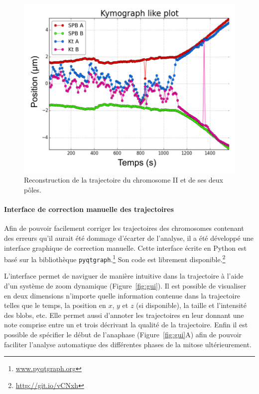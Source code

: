 \documentclass[12pt,a4paper,twoside,openright]{book}
\let\oldparagraph\paragraph
\renewcommand{\paragraph}[1]{\oldparagraph{#1}\mbox{}}
\begin{document}
\begin{figure}[htbp]
\centering
\includegraphics{figures/results/imaging/cen2.png}
\caption[Reconstruction de la trajectoire du chromosome II et de ces deux pôles.]{\label{fig:cen2}Reconstruction
de la trajectoire du chromosome II et de ses deux pôles.}
\end{figure}

\paragraph{Interface de correction manuelle des
trajectoires}\label{interface-de-correction-manuelle-des-trajectoires}

Afin de pouvoir facilement corriger les trajectoires des chromosomes
contenant des erreurs qu'il aurait été dommage d'écarter de l'analyse,
il a été développé une interface graphique de correction manuelle. Cette
interface écrite en Python est basé sur la bibliothèque
\texttt{pyqtgraph}.\footnote{\url{www.pyqtgraph.org}} Son code est
librement disponible.\footnote{\url{http://git.io/vCNxh}}

L'interface permet de naviguer de manière intuitive dans la trajectoire
à l'aide d'un système de zoom dynamique (Figure~\ref{fig:gui}). Il est
possible de visualiser en deux dimensions n'importe quelle information
contenue dans la trajectoire telles que le temps, la position en \(x\),
\(y\) et \(z\) (si disponible), la taille et l'intensité des blobs, etc.
Elle permet aussi d'annoter les trajectoires en leur donnant une note
comprise entre un et trois décrivant la qualité de la trajectoire. Enfin
il est possible de spécifier le début de l'anaphase
(Figure~\ref{fig:gui}A) afin de pouvoir faciliter l'analyse automatique
des différentes phases de la mitose ultérieurement.
\end{document}
